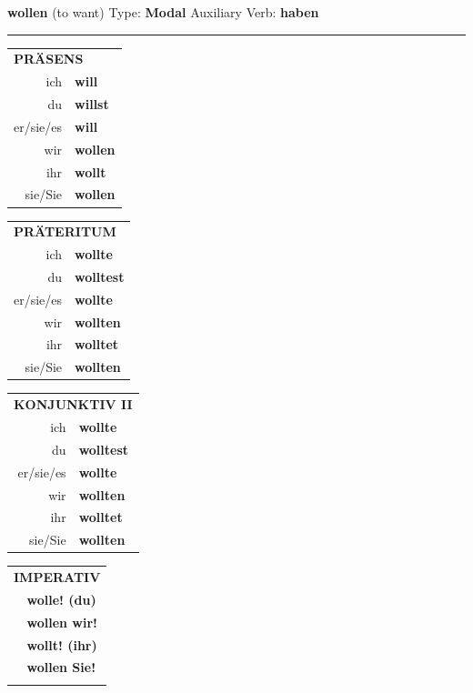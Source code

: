 \documentclass[10pt,a4paper]{revtex4-2}
\begin{document}
\begin{verbbox-modal}
    {\Large \bf wollen} (to want) \hfill Type: \textbf{Modal} \hfill Auxiliary Verb: \textbf{haben} 
     \vspace{5pt}
    \hrule
    \vspace{5pt}
  \begin{tabular}{rl}
     \multicolumn{2}{l}{\textbf{PRÄSENS} }\\
    ich & \textbf{will}\\
    du & \textbf{willst}\\
    er/sie/es & \textbf{will}\\
    wir & \textbf{wollen}\\
    ihr & \textbf{wollt}\\
    sie/Sie & \textbf{wollen}\\
  \end{tabular}
  \hfill
     \begin{tabular}{rl}
    \multicolumn{2}{l}{\textbf{PRÄTERITUM} }\\
    ich & \textbf{wollte}\\
    du & \textbf{wolltest}\\
    er/sie/es & \textbf{wollte}\\
    wir & \textbf{wollten}\\
    ihr & \textbf{wolltet}\\
    sie/Sie & \textbf{wollten}\\
  \end{tabular}
   \hfill
     \begin{tabular}{rl}
    \multicolumn{2}{l}{\textbf{KONJUNKTIV II} }\\
    ich & \textbf{wollte}\\
    du & \textbf{wolltest}\\
    er/sie/es & \textbf{wollte}\\
    wir & \textbf{wollten}\\
    ihr & \textbf{wolltet}\\
    sie/Sie & \textbf{wollten}\\
  \end{tabular}
  \hfill
  \begin{tabular}{rl}
     \multicolumn{2}{l}{\textbf{IMPERATIV} }\\
   & \textbf{wolle! (du)}\\
   & \textbf{wollen wir!}\\
   & \textbf{wollt! (ihr)}\\
   & \textbf{wollen Sie!}\\
   & \vspace{10pt}
  \end{tabular}


\end{verbbox-modal}
\end{document}
